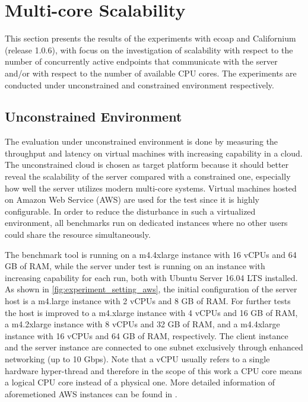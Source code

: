 
\section{Multi-core Scalability} \label{multi_core_scalability}

This section presents the results of the experiments with ecoap and Californium (release 1.0.6), with focus on the investigation of scalability with respect to the number of concurrently active endpoints that communicate with the server and/or with respect to the number of available CPU cores. The experiments are conducted under unconstrained and constrained environment respectively. 

\subsection{Unconstrained Environment}

The evaluation under unconstrained environment is done by measuring the throughput and latency on virtual machines with increasing capability in a cloud. The unconstrained cloud is chosen as target platform because it should better reveal the scalability of the server compared with a constrained one, especially how well the server utilizes modern multi-core systems. Virtual machines hosted on Amazon Web Service (AWS) are used for the test since it is highly configurable. In order to reduce the disturbance in such a virtualized environment, all benchmarks run on dedicated instances \autocite{aws_dedicated_instance} where no other users could share the resource simultaneously. 

The benchmark tool is running on a m4.4xlarge instance with 16 vCPUs and 64 GB of RAM, while the server under test is running on an instance with increasing capability for each run, both with Ubuntu Server 16.04 LTS installed. As shown in \autoref{fig:experiment_setting_aws}, the initial configuration of the server host is a m4.large instance with 2 vCPUs and 8 GB of RAM. For further tests the host is improved to a m4.xlarge instance with 4 vCPUs and 16 GB of RAM, a m4.2xlarge instance with 8 vCPUs and 32 GB of RAM, and a m4.4xlarge instance with 16 vCPUs and 64 GB of RAM, respectively. The client instance and the server instance are connected to one subnet exclusively through enhanced networking (up to 10 Gbps). Note that a vCPU usually refers to a single hardware hyper-thread and therefore in the scope of this work a CPU core means a logical CPU core instead of a physical one. More detailed information of aforemetioned AWS instances can be found in \autocite{aws_instance}.

